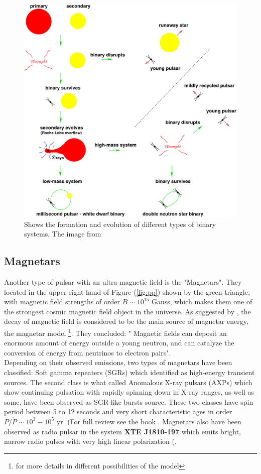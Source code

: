 \begin{figure}[H] 
\centering    
\includegraphics[width=1.0\textwidth]{MSformation.png}
\caption[Formation model of the Binary system]{Shows the formation and evolution of different types of binary systems, The image from \citep{Lorimer2001}  
}
\label{fig:mspf}
\end{figure}


\subsection{Magnetars}
Another type of pulsar with an ultra-magnetic field is the "Magnetars". They located in the upper right-hand of Figure (\ref{fig:pp}) shown by the green triangle, with magnetic field strengths of order $B \sim 10^{15}$ Gauss, which makes them one of the strongest cosmic magnetic field object in the universe. As suggested by \citet{thompson1993neutron}, the decay of magnetic field is considered to be the main source of magnetar energy, the magnetar model \footnote{\citet{duncan1992formation} for more details in different possibilities of the model}. They concluded: " Magnetic fields can deposit an enormous amount of energy outside a young neutron, and can catalyze the conversion of energy from neutrinos to electron pairs".\\
Depending on their observed emissions, two types of magnetars have been classified: Soft gamma repeaters (SGRs) which identified as high-energy transient sources. The second class is what called Anomalous X-ray pulsars (AXPs) which show continuing pulsation with rapidly spinning down in X-ray ranges, as well as some, have been observed as SGR-like bursts source. These two classes have spin period between 5 to 12 seconds and very short characteristic ages in order $ P / \dot{P} \sim 10^{3} - 10^{5}$ yr. (For full review see the book \citet{lewin2006compact}. Magnetars also have been observed as radio pulsar in the system \textbf{XTE J1810-197} which emits bright, narrow radio pulses with very high linear polarization (\citet{camilo2006transient}.%


